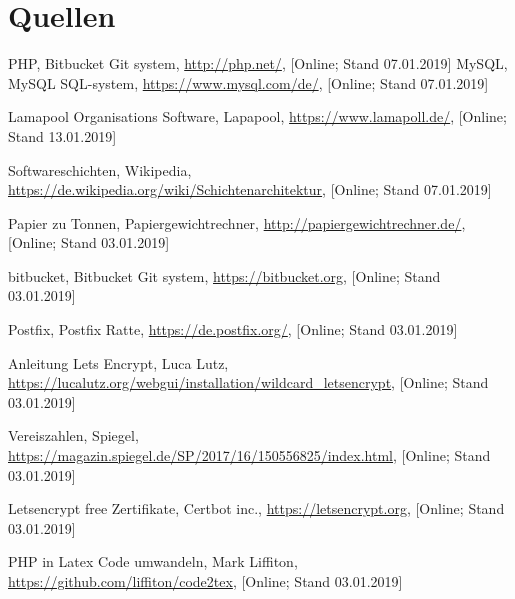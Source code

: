 \documentclass[12pt,twoside]{article}  %
\begin{document}
  \section{Quellen}
  \begin{thebibliography}{15}
	         PHP,
			      Bitbucket Git system,
	                      \url{http://php.net/},
                              [Online; Stand 07.01.2019]
%	
	       MySQL,
			      MySQL SQL-system,
	                      \url{https://www.mysql.com/de/},
                              [Online; Stand 07.01.2019]
	
            Lamapool Organisations Software,
			      Lapapool,
	                      \url{https://www.lamapoll.de/},
                              [Online; Stand 13.01.2019]
	
         Softwareschichten,
			            Wikipedia,
	                            \url{https://de.wikipedia.org/wiki/Schichtenarchitektur},
                                    [Online; Stand 07.01.2019]
        
         Papier zu Tonnen,
                                Papiergewichtrechner,
			        \url{http://papiergewichtrechner.de/},
			        [Online; Stand 03.01.2019]

	         bitbucket,
			      Bitbucket Git system,
	                      \url{https://bitbucket.org},
                              [Online; Stand 03.01.2019]
	
	     Postfix,
			      Postfix Ratte,
	                      \url{https://de.postfix.org/},
       			      [Online; Stand 03.01.2019]

         Anleitung Lets Encrypt,
                              Luca Lutz,
			      \url{https://lucalutz.org/webgui/installation/wildcard_letsencrypt},
			      [Online; Stand 03.01.2019]
       
         Vereiszahlen,
			      Spiegel,
                              \url{https://magazin.spiegel.de/SP/2017/16/150556825/index.html},
			      [Online; Stand 03.01.2019]
	
         Letsencrypt free Zertifikate,
		              Certbot inc.,
		              \url{https://letsencrypt.org},
			      [Online; Stand 03.01.2019]
	
	 PHP in Latex Code umwandeln,
		            Mark Liffiton,
		            \url{https://github.com/liffiton/code2tex},
			    [Online; Stand 03.01.2019]
	

\end{thebibliography}
\end{document}
